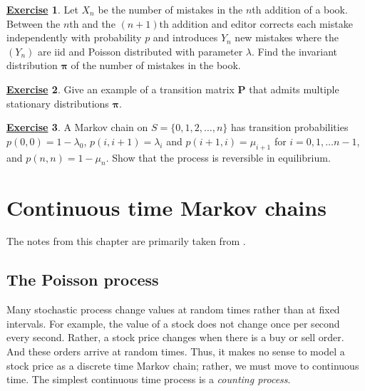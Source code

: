 \documentclass[12pt]{book}
\numberwithin{equation}{chapter}
\theoremstyle{plain}
\numberwithin{theorem}{section}
\theoremstyle{definition}
\newtheorem{exercise}{\underline{Exercise}}
\numberwithin{exercise}{chapter}
\newcommand{\<}{\langle}
\renewcommand{\>}{\rangle}
\renewcommand{\(}{\left(}
\renewcommand{\)}{\right)}
\renewcommand{\[}{\left[}
\renewcommand{\]}{\right]}
\newcommand\lam{\lambda}
\newcommand\Pv{\pmb{P}}
\newcommand\piv{\pmb{\pi}}
\begin{document}
\begin{exercise}
\label{exer:4.6}
Let $X_n$ be the number of mistakes in the $n$th addition of a book.  Between the $n$th and the $(n+1)$th addition and editor corrects each mistake independently with probability $p$ and introduces $Y_n$ new mistakes where the $(Y_n)$ are iid and Poisson distributed with parameter $\lam$.  Find the invariant distribution $\piv$ of the number of mistakes in the book.
\end{exercise}

\begin{exercise}
\label{exer:4.7}
Give an example of a transition matrix $\Pv$ that admits multiple stationary distributions $\piv$.
\end{exercise}

\begin{exercise}
\label{exer:4.8}
A Markov chain on $S = \{0,1,2,\ldots,n\}$ has transition probabilities
$p(0,0)=1-\lam_0$,
$p(i,i+1)=\lam_i$ and $p(i+1,i)=\mu_{i+1}$ for $i = 0, 1, \ldots n-1$,
and
$p(n,n)=1-\mu_n$.
Show that the process is reversible in equilibrium.
\end{exercise}

%
%

\chapter{Continuous time Markov chains}
\label{chapter:ctmc}
The notes from this chapter are primarily taken from \cite[Chapter 6]{gs2001}.


\section{The Poisson process}
\label{sec:poisson}

Many stochastic process change values at random times rather than at fixed intervals.  For example, the value of a stock does not change once per second every second.  Rather, a stock price changes when there is a buy or sell order.  And these orders arrive at random times.  Thus, it makes no sense to model a stock price as a discrete time Markov chain; rather, we must move to continuous time.  The simplest continuous time process is a \emph{counting process}.  
\end{document}
